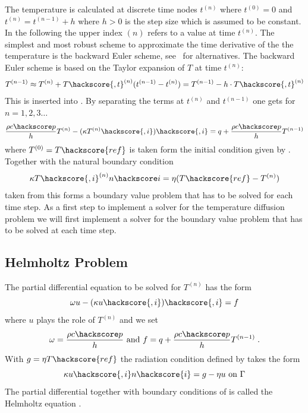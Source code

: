The temperature is calculated at discrete time nodes $t^{(n)}$ where 
$t^{(0)}=0$ and  $t^{(n)}=t^{(n-1)}+h$ where $h>0$ is the step size which is assumed to be constant. 
In the following the upper index ${(n)}$ refers to a value at time $t^{(n)}$. The simplest
and most robust scheme to approximate the time derivative of the the temperature is 
the backward Euler
 scheme, see~\cite{XXX} for alternatives. The backward Euler 
scheme is based
on the Taylor expansion of $T$ at time $t^{(n)}$:
\begin{equation}
T^{(n-1)}\approx T^{(n)}+T\hackscore{,t}^{(n)}(t^{(n-1)}-t^{(n)})
=T^{(n-1)} - h \cdot T\hackscore{,t}^{(n)}
\label{DIFFUSION TEMP EQ 6}
\end{equation}
This is inserted into . By separating the terms at 
$t^{(n)}$ and  $t^{(n-1)}$ one gets for $n=1,2,3\ldots$
\begin{equation}
\frac{\rho c\hackscore p}{h} T^{(n)} - (\kappa T^{(n)}\hackscore{,i})\hackscore{,i} = q +  \frac{\rho c\hackscore p}{h} T^{(n-1)}
\label{DIFFUSION TEMP EQ 7}
\end{equation}
where $T^{(0)}=T\hackscore{ref}$ is taken form the initial condition given by .
Together with the natural boundary condition 
\begin{equation}
 \kappa T\hackscore{,i}^{(n)} n\hackscore i = \eta (T\hackscore{ref}-T^{(n)}) 
\label{DIFFUSION TEMP EQ 2222}
\end{equation}
taken from 
this forms a boundary value problem that has to be solved for each time step. 
As a first step to implement a solver for the temperature diffusion problem we will 
first implement a solver for the  boundary value problem that has to be solved at each time step.

\subsection{\label{DIFFUSION HELM SEC}Helmholtz Problem}
The partial differential equation to be solved for $T^{(n)}$ has the form 
\begin{equation}
\omega u  - (\kappa u\hackscore{,i})\hackscore{,i} = f
\label{DIFFUSION HELM EQ 1}
\end{equation}
where $u$ plays the role of $T^{(n)}$ and we set
\begin{equation}
\omega=\frac{\rho c\hackscore p}{h} \mbox{ and } f=q+\frac{\rho c\hackscore p}{h}T^{(n-1)} \;.
\label{DIFFUSION HELM EQ 1b}
\end{equation}
With $g=\eta T\hackscore{ref}$ the radiation condition defined by 
takes the form 
\begin{equation}
\kappa u\hackscore{,i} n\hackscore{i} =  g - \eta u\mbox{ on } \Gamma
\label{DIFFUSION HELM EQ 2}
\end{equation}
The partial differential 
 together with boundary conditions of 
is called the Helmholtz equation . 

